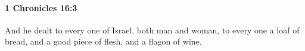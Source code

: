 
		\paragraph{1 Chronicles 16:3} %
			\label{1CHRONICLES-16-3}

			And he dealt to every one of Israel, both man and woman, to every one a loaf of bread, and a good piece of flesh, and a flagon of wine.


